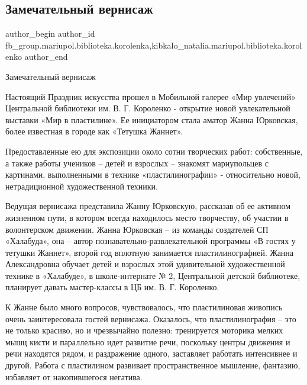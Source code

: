  
 
 
 
 

\subsection{Замечательный вернисаж}
\label{sec:18_02_2018.fb.fb_group.mariupol.biblioteka.korolenka.1.zamechatelnii_vernis}
 
\ifcmt
 author_begin
   author_id fb_group.mariupol.biblioteka.korolenka,kibkalo_natalia.mariupol.biblioteka.korolenko
 author_end
\fi


Замечательный вернисаж

Настоящий Праздник искусства прошел в Мобильной галерее «Мир увлечений»
Центральной библиотеки им. В. Г. Короленко - открытие новой увлекательной
выставки «Мир в пластилине». Ее инициатором стала аматор Жанна Юрковская, более
известная в городе как «Тетушка Жаннет». 

Предоставленные ею для экспозиции около сотни творческих работ: собственные, а
также работы учеников – детей и взрослых – знакомят мариупольцев с картинами,
выполненными в технике «пластилинографии» - относительно новой, нетрадиционной
художественной техники. 

Ведущая вернисажа представила Жанну Юрковскую, рассказав об ее активном
жизненном пути, в котором всегда находилось место творчеству, об участии в
волонтерском движении. Жанна Юрковская – из команды создателей СП «Халабуда»,
она – автор познавательно-развлекательной программы «В гостях у тетушки
Жаннет»,  второй год вплотную занимается пластилинографией.  Жанна
Александровна обучает детей и взрослых этой удивительной художественной технике
в  «Халабуде», в школе-интернате № 2, Центральной детской библиотеке, планирует
давать мастер-классы в ЦБ им. В. Г. Короленко.

К Жанне было много вопросов, чувствовалось, что пластилиновая живопись очень
заинтересовала гостей вернисажа.  Оказалось, что пластилинография – это не
только красиво, но и чрезвычайно полезно: тренируется моторика мелких мышц
кисти и параллельно идет развитие речи, поскольку  центры движения и речи
находятся рядом,  и раздражение одного, заставляет работать интенсивнее и
другой. Работа с пластилином развивает пространственное мышление, фантазию,
избавляет от накопившегося негатива. 

